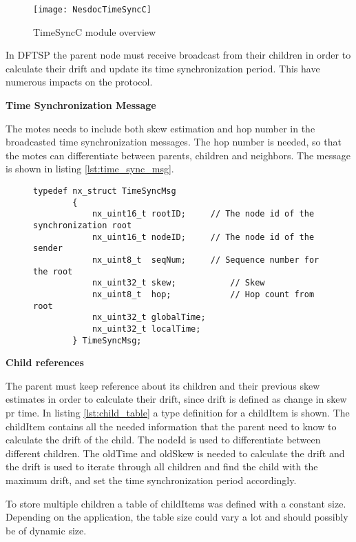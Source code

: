 \documentclass[Main]{subfiles}
\begin{document}
				\begin{figure}[H]
					\centering
					\texttt{[image: NesdocTimeSyncC]}
					\caption{TimeSyncC module overview}
					\label{fig:nesdoc_time_sync_c}
				\end{figure}

				In DFTSP the parent node must receive broadcast from their children in order to calculate their drift and update its time synchronization period.
				This have numerous impacts on the protocol.

				\textbf{Time Synchronization Message}
				
					The motes needs to include both skew estimation and hop number in the broadcasted time synchronization messages. 
					The hop number is needed, so that the motes can differentiate between parents, children and neighbors. 
					The message is shown in listing \ref{lst:time_sync_msg}.
					\begin{figure}[H]
						\begin{lstlisting}[caption=TimeSyncMsg, style=Code-C, label=lst:time_sync_msg]
		typedef nx_struct TimeSyncMsg
		{
			nx_uint16_t	rootID;		// The node id of the synchronization root
			nx_uint16_t	nodeID;		// The node id of the sender
			nx_uint8_t	seqNum;		// Sequence number for the root
			nx_uint32_t skew;			// Skew 
			nx_uint8_t  hop;			// Hop count from root
			nx_uint32_t	globalTime;
			nx_uint32_t localTime;
		} TimeSyncMsg;
						\end{lstlisting}
					\end{figure}
			
				
				\textbf{Child references}

					The parent must keep reference about its children and their previous skew estimates in order to calculate their drift, since drift is defined as change in skew pr time.
					In listing \ref{lst:child_table} a type definition for a childItem is shown. 
					The childItem contains all the needed information that the parent need to know to calculate the drift of the child.
					The nodeId is used to differentiate between different children.
					The oldTime and oldSkew is needed to calculate the drift and the drift is used to iterate through all children and find the child with the maximum drift, and set the time synchronization period accordingly.

					To store multiple children a table of childItems was defined with a constant size. Depending on the application, the table size could vary a lot and should possibly be of dynamic size.
\end{document}
